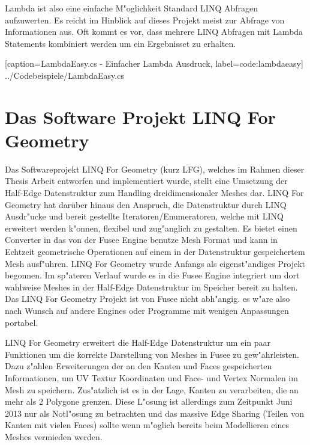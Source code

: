 \documentclass[pagesize, paper=a4, fontsize=12pt,titlepage=true, headings=small, headnosepline, abstractoff, liststotoc, nochapterprefix, plainheadsepline]{scrreprt}
\newcommand{\LFGS}{LINQ For Geometry }
\newcommand{\HES}{Half-Edge Datenstruktur }
\begin{document}
Lambda ist also eine einfache M"oglichkeit Standard LINQ Abfragen aufzuwerten. Es reicht im Hinblick auf dieses Projekt meist zur Abfrage von Informationen aus. Oft kommt es vor, dass mehrere LINQ Abfragen mit Lambda Statements kombiniert werden um ein Ergebnisset zu erhalten. 

			[caption={LambdaEasy.cs - Einfacher Lambda Ausdruck}, label=code:lambdaeasy]
			{../Codebeispiele/LambdaEasy.cs}


\section {Das Software Projekt LINQ For Geometry}
Das Softwareprojekt \LFGS (kurz LFG), welches im Rahmen dieser Thesis Arbeit entworfen und implementiert wurde, stellt eine Umsetzung der \HES zum Handling dreidimensionaler Meshes dar. \LFGS hat darüber hinaus den Anspruch, die Datenstruktur durch LINQ Ausdr"ucke und bereit gestellte Iteratoren/Enumeratoren, welche mit LINQ erweitert werden k"onnen, flexibel und zug"anglich zu gestalten. Es bietet einen Converter in das von der Fusee Engine benutze Mesh Format und kann in Echtzeit geometrische Operationen auf einem in der Datenstruktur gespeichertem Mesh ausf"uhren. \LFGS wurde Anfangs als eigenst"andiges Projekt begonnen. Im sp"ateren Verlauf wurde es in die Fusee Engine integriert um dort wahlweise Meshes in der \HES im Speicher bereit zu halten. Das \LFGS Projekt ist von Fusee nicht abh"angig. es w"are also nach Wunsch auf andere Engines oder Programme mit wenigen Anpassungen portabel.

\LFGS erweitert die \HES um ein paar Funktionen um die korrekte Darstellung von Meshes in Fusee zu gew"ahrleisten. Dazu z"ahlen Erweiterungen der an den Kanten und Faces gespeicherten Informationen, um UV Textur Koordinaten und Face- und Vertex Normalen im Mesh zu speichern.
Zus"atzlich ist es in der Lage, Kanten zu verarbeiten, die an mehr als 2 Polygone grenzen. Diese L"osung ist allerdings zum Zeitpunkt Juni 2013 nur als Notl"osung zu betrachten und das massive Edge Sharing (Teilen von Kanten mit vielen Faces) sollte wenn m"oglich bereits beim Modellieren eines Meshes vermieden werden.
\newline
\end{document}
